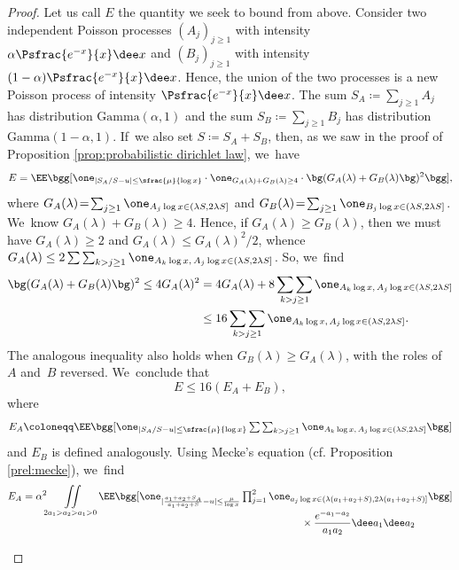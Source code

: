 \begin{proof} Let us call $E$ the quantity we seek to bound from above.
Consider two independent Poisson processes $(A_j)_{j \ge 1}$ with intensity $\alpha\Psfrac{e^{-x}}{x} \dee x$ and $(B_j)_{j \ge 1}$ with intensity $(1-\alpha)\Psfrac{e^{-x}}{x} \dee x$. Hence, the union of the two processes is a new Poisson process of intensity $\Psfrac{e^{-x}}{x}\dee x$.
The sum $S_A \coloneqq \sum_{j\ge1} A_j$ has distribution $\text{Gamma}(\alpha, 1)$ and the sum $S_B \coloneqq \sum_{j\ge1} B_j$ has distribution $\text{Gamma}(1-\alpha, 1)$. If~we also set $S\coloneqq S_A+S_B$, then, as we saw in the proof of Proposition \ref{prop:probabilistic dirichlet law}, we~have
\[
E
=\EE\bgg[ \one_{| S_A/S- u |\le \sfrac{\mu}{\log x} } \cdot \one_{G_A(\lambda)+G_B(\lambda)\ge 4}\cdot \bg( G_A(\lambda)+G_B(\lambda) \bg)^2 \bgg],
\]
where $G_A(\lambda) \!=\! \sum_{j\ge1} \one_{A_j\log x\in(\lambda S,2\lambda S]}$ and $G_B(\lambda)\!=\! \sum_{j\ge1} \one_{B_j\log x\in(\lambda S,2\lambda S]}$. We~know $G_A(\lambda)+G_B(\lambda)\ge4$. Hence, if $G_A(\lambda)\ge G_B(\lambda)$, then we must have \hbox{$G_A(\lambda)\ge 2$} and $G_A(\lambda)\le G_A(\lambda)^2/2$, whence $G_A(\lambda) \le 2\mathop{\sum\sum}_{k>j\ge1} \one_{A_k\log x,\, A_j\log x\in (\lambda S,2\lambda S]}$. So, we~find
\[
\begin{split}
\bg( G_A(\lambda)+G_B(\lambda) \bg)^2 \le 4G_A(\lambda)^2
&= 4 G_A(\lambda) + 8 \mathop{\sum\sum}_{k>j\ge1} \one_{A_k\log x,\, A_j\log x\in (\lambda S,2\lambda S]} \\
&\le 16 \mathop{\sum\sum}_{k>j\ge1} \one_{A_k\log x,\, A_j\log x\in (\lambda S,2\lambda S]}.
\end{split}
\]
The analogous inequality also holds when $G_B(\lambda)\ge G_A(\lambda)$, with the roles of $A$ and~$B$ reversed. We~conclude that
\[
E
\le 16 (E_A+E_B),
\]
where
\[
E_A \coloneqq \EE\bgg[\textstyle \one_{|S_A/S - u |\le \sfrac{\mu}{\log x} } \mathop{\sum\sum}_{k>j\ge1} \one_{A_k\log x,\, A_j\log x\in (\lambda S,2\lambda S]} \bgg]
\]
and $E_B$ is defined analogously. Using Mecke's equation (cf. Proposition \ref{prel:mecke}), we~find
\[
\begin{split}
E_A &= \alpha^2\iint\limits_{2a_1>a_2>a_1>0}
\EE\bgg[\textstyle \one_{| \frac{a_1+a_2+S_A}{a_1+a_2+S} - u |\le \frac{\mu}{\log x} } \prod_{j=1}^2 \one_{a_j\log x \in (\lambda (a_1+a_2+S),2\lambda (a_1+a_2+S)]} \bgg] \\[-10pt]
&\hspace*{9.5cm} \times \frac{e^{-a_1-a_2}}{a_1a_2}\dee a_1\dee a_2 \\[6pt]

\end{split}\]
\end{proof}
